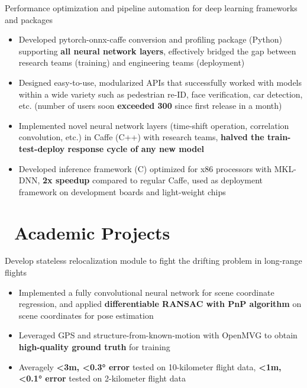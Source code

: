 \documentclass{resume}
\begin{document}
Performance optimization and pipeline automation for deep learning frameworks and packages
\begin{itemize}
  \item Developed pytorch-onnx-caffe conversion and profiling package (Python) supporting \textbf{all neural network layers}, effectively bridged the gap between research teams (training) and engineering teams (deployment) 
  \item Designed easy-to-use, modularized APIs that successfully worked with models within a wide variety such as pedestrian re-ID, face verification, car detection, etc. (number of users soon \textbf{exceeded 300} since first release in a month)
  \item Implemented novel neural network layers (time-shift operation, correlation convolution, etc.) in Caffe (C++) with research teams, \textbf{halved the train-test-deploy response cycle of any new model} 
  \item Developed inference framework (C) optimized for x86 processors with MKL-DNN, \textbf{2x speedup} compared to regular Caffe, used as deployment framework on development boards and light-weight chips
\end{itemize}

\section{\faBook\ Academic Projects}
Develop stateless relocalization module to fight the drifting problem in long-range flights
\begin{itemize}
  \item Implemented a fully convolutional neural network for scene coordinate regression, and applied \textbf{differentiable RANSAC with PnP algorithm} on scene coordinates for pose estimation
  \item Leveraged GPS and structure-from-known-motion with OpenMVG to obtain \textbf{high-quality ground truth} for training
  \item Averagely \textbf{<3m, <0.3° error} tested on 10-kilometer flight data, \textbf{<1m, <0.1° error} tested on 2-kilometer flight data
\end{itemize}
\end{document}
